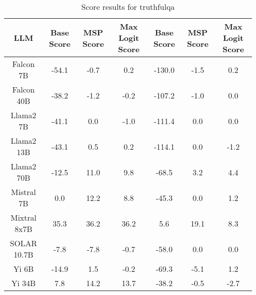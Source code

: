 \renewcommand\arraystretch{1.2}
\begin{table*}
\centering
\begin{tabular}{c|c|c|c|c|c|c}
LLM & Base Score & MSP Score & Max Logit Score & Base Score & MSP Score & Max Logit Score\\ \hline
Falcon 7B & -54.1 & -0.7 & 0.2 & -130.0 & -1.5 & 0.2\\
Falcon 40B & -38.2 & -1.2 & -0.2 & -107.2 & -1.0 & 0.0\\
Llama2 7B & -41.1 & 0.0 & -1.0 & -111.4 & 0.0 & 0.0\\
Llama2 13B & -43.1 & 0.5 & 0.2 & -114.1 & 0.0 & -1.2\\
Llama2 70B & -12.5 & 11.0 & 9.8 & -68.5 & 3.2 & 4.4\\
Mistral 7B & 0.0 & 12.2 & 8.8 & -45.3 & 0.0 & 1.2\\
Mixtral 8x7B & 35.3 & 36.2 & 36.2 & 5.6 & 19.1 & 8.3\\
SOLAR 10.7B & -7.8 & -7.8 & -0.7 & -58.0 & 0.0 & 0.0\\
Yi 6B & -14.9 & 1.5 & -0.2 & -69.3 & -5.1 & 1.2\\
Yi 34B & 7.8 & 14.2 & 13.7 & -38.2 & -0.5 & -2.7\\
\hline
\end{tabular}
\caption{Score results for truthfulqa}
\end{table*}
\label{tab:truthfulqa_score}
